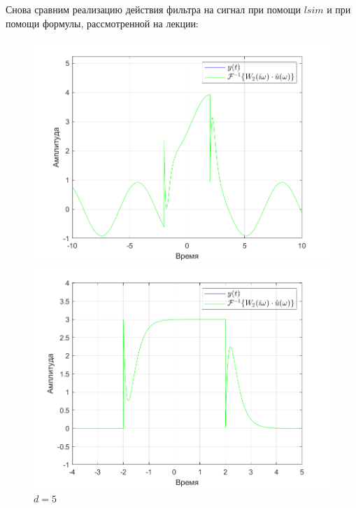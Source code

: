 \documentclass[a4paper]{article}
\begin{document}
Снова сравним реализацию действия фильтра на сигнал при помощи $lsim$ и при помощи формулы, рассмотренной на лекции: 

\begin{figure}[H]
    \begin{minipage}{0.5\textwidth}
        \centering
        \includegraphics[width=\linewidth]{ex1_2/a1=0_a2=25_b1=10.5_b2=25_d=1/h3.png}
        \caption{$d=1$}
    \end{minipage}
    \begin{minipage}{0.5\textwidth}
        \centering
        \includegraphics[width=\linewidth]{ex1_2/a1=0_a2=25_b1=10.5_b2=25_d=5/h3.png}
        \caption{$d=5$}
    \end{minipage}
\end{figure}
\end{document}
